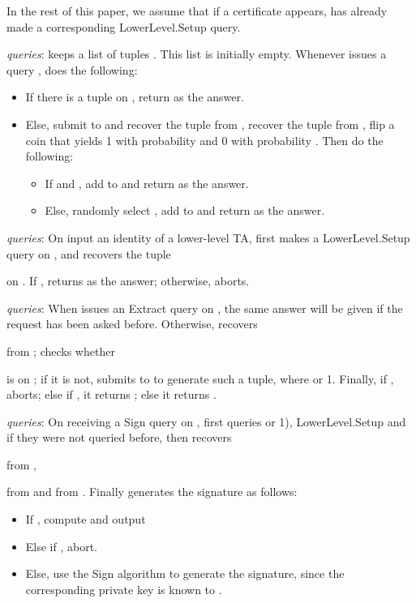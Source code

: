 \documentclass[10pt,journal,compsoc]{IEEEtran}
\begin{document}
In the rest of this paper, we assume that if a certificate
 appears,  has already made a
corresponding {\sf LowerLevel.Setup} query.

\smallskip \noindent  \emph{queries}:  keeps a list
 of tuples . This list
is initially empty. Whenever  issues a query
,  does the following:
\begin{itemize}
  \item If there is a tuple  on
  , return  as the answer.
  \item Else, submit  to  and recover the tuple
        from ,
       recover the tuple  
from , flip a coin  that yields 1 with probability  and 0
with probability . Then do the following:
     \begin{itemize}
       \item If  and , add  to  and
       return  as the answer.

       \item Else, randomly select , add
        to  and return
        as the answer.
     \end{itemize}
\end{itemize}

 \emph{queries}: On input an identity
 of a lower-level TA,  first makes
a {\sf LowerLevel.Setup} query on , and recovers the
tuple

on . If ,  returns
 as the answer; otherwise,  aborts.

\smallskip
{} \emph{queries}: When  issues
an {\sf Extract} query on , the same
answer will be given if the request has been asked before.
Otherwise,  recovers

from ;  checks whether

is on ; if it is not,  submits
 to  to generate such a tuple, where  or
1. Finally,
if ,  aborts;
else if , it returns
  ; else it returns .

\smallskip
{} \emph{queries}: On receiving a {\sf Sign} query
on ,  first queries
  or 1), {\sf
LowerLevel.Setup} and
 if they were not queried
before, then recovers

from ,

from  and 
from . Finally  generates the signature as
follows:
\begin{itemize}
    \item  If , compute and output
    

    \item Else if , abort.

    \item Else, use the {\sf Sign} algorithm to generate the signature,
    since the corresponding private key is known to .
\end{itemize}
\end{document}
